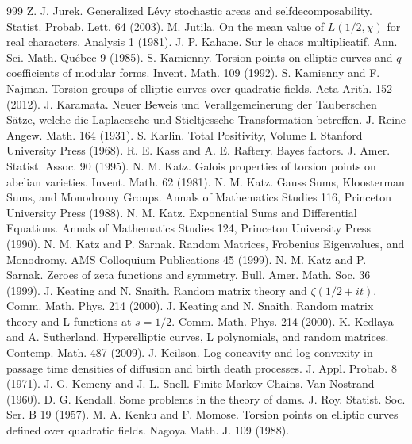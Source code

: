 \begin{thebibliography}{999}
 Z. J. Jurek. Generalized L\'evy stochastic areas and selfdecomposability. Statist. Probab. Lett. 64 (2003).
 M. Jutila. On the mean value of $L(1/2,\chi)$ for real characters. Analysis 1 (1981).
 J. P. Kahane. Sur le chaos multiplicatif. Ann. Sci. Math. Qu\'ebec 9 (1985).
 S. Kamienny. Torsion points on elliptic curves and $q$ coefficients of modular forms. Invent. Math. 109 (1992).
 S. Kamienny and F. Najman. Torsion groups of elliptic curves over quadratic fields. Acta Arith. 152 (2012).
 J. Karamata. Neuer Beweis und Verallgemeinerung der Tauberschen S\"atze, welche die Laplacesche und Stieltjessche Transformation betreffen. J. Reine Angew. Math. 164 (1931).
 S. Karlin. Total Positivity, Volume I. Stanford University Press (1968).
 R. E. Kass and A. E. Raftery. Bayes factors. J. Amer. Statist. Assoc. 90 (1995).
 N. M. Katz. Galois properties of torsion points on abelian varieties. Invent. Math. 62 (1981).
 N. M. Katz. Gauss Sums, Kloosterman Sums, and Monodromy Groups. Annals of Mathematics Studies 116, Princeton University Press (1988).
 N. M. Katz. Exponential Sums and Differential Equations. Annals of Mathematics Studies 124, Princeton University Press (1990).
 N. M. Katz and P. Sarnak. Random Matrices, Frobenius Eigenvalues, and Monodromy. AMS Colloquium Publications 45 (1999).
 N. M. Katz and P. Sarnak. Zeroes of zeta functions and symmetry. Bull. Amer. Math. Soc. 36 (1999).
 J. Keating and N. Snaith. Random matrix theory and $\zeta(1/2+it)$. Comm. Math. Phys. 214 (2000).
 J. Keating and N. Snaith. Random matrix theory and L functions at $s=1/2$. Comm. Math. Phys. 214 (2000).
 K. Kedlaya and A. Sutherland. Hyperelliptic curves, L polynomials, and random matrices. Contemp. Math. 487 (2009).
 J. Keilson. Log concavity and log convexity in passage time densities of diffusion and birth death processes. J. Appl. Probab. 8 (1971).
 J. G. Kemeny and J. L. Snell. Finite Markov Chains. Van Nostrand (1960).
 D. G. Kendall. Some problems in the theory of dams. J. Roy. Statist. Soc. Ser. B 19 (1957).
 M. A. Kenku and F. Momose. Torsion points on elliptic curves defined over quadratic fields. Nagoya Math. J. 109 (1988).

\end{thebibliography}
